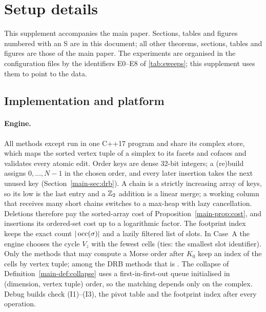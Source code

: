 
\section{Setup details}\label{sec:s-setup}

This supplement accompanies the main paper. Sections, tables and figures
numbered with an S are in this document; all other theorems, sections, tables
and figures are those of the main paper. The experiments are organised in the
configuration files by the identifiers E0--E8 of \cref{tab:sweeps}; this
supplement uses them to point to the data.

\subsection{Implementation and platform}\label{sec:exp-platform}

\paragraph{Engine.}
All methods except  run in one C++17 program and share its
complex store, which maps the sorted vertex tuple of a simplex to its facets and
cofaces and validates every atomic edit. Order keys are dense 32-bit integers; a
(re)build assigns $0,\dots,N-1$ in the chosen order, and every later insertion
takes the next unused key (Section~\ref{main-sec:drb}). A chain is a strictly increasing
array of keys, so its low is the last entry and a $\mathbb{Z}_2$ addition is a linear
merge; a working column that receives many short chains switches to a max-heap
with lazy cancellation. Deletions therefore pay the sorted-array cost of
Proposition~\ref{main-prop:cost}, and insertions its ordered-set cost up to a logarithmic
factor. The footprint index keeps the exact count $|\operatorname{occ}(\sigma)|$ and a lazily
filtered list of slots. In Case~A the engine chooses the cycle $V_z$ with the
fewest cells (ties: the smallest slot identifier). Only the methods that may
compute a Morse order after $K_0$ keep an index of the cells by vertex tuple;
among the DRB methods that is . The collapse of
Definition~\ref{main-def:collapse} uses a first-in-first-out queue initialised in (dimension,
vertex tuple) order, so the matching depends only on the complex. Debug builds
check (I1)--(I3), the pivot table and the footprint index after every operation.

